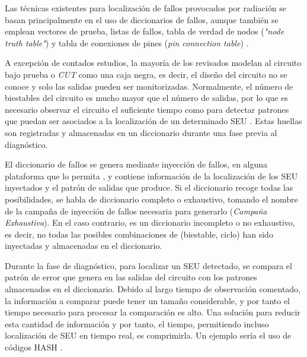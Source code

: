 Las técnicas existentes para localización de fallos provocados por radiación se
basan principalmente en el uso de diccionarios de fallos, aunque también se
emplean vectores de prueba, listas de fallos, tabla de verdad de nodos
(\textit{"node truth table"}) y tabla de conexiones de pines (\textit{pin
connection table}) \cite{DiagnosisTechniques, LASAR, RTFDandD}. 

A excepción de contados estudios, la mayoría de los revisados modelan al 
circuito bajo prueba o \textit{\gls{CUT}} como una caja negra, es decir, el diseño
del circuito no se conoce y solo las salidas pueden ser monitorizadas.
Normalmente, el número de biestables del circuito es mucho mayor que el número de
salidas, por lo que es necesario observar el circuito el suficiente tiempo como
para detectar patrones que puedan ser asociados a la localización de un
determinado \gls{SEU} \cite{SEUDiagnosis}. Estas huellas son registradas y
almacenadas en un diccionario durante una fase previa al diagnóstico.

El diccionario de fallos se genera mediante inyección de fallos, en alguna
plataforma que lo permita \cite{FastFI, LeonFI, FTU}, y contiene información de 
la localización de los \gls{SEU} inyectados y el patrón de salidas que produce. 
Si el diccionario recoge todas las posibilidades, se habla de diccionario 
completo o exhaustivo, tomando el nombre de la campaña de inyección de fallos 
necesaria para generarlo (\textit{Campaña Exhaustiva}). En el caso contrario, es 
un diccionario incompleto o no exhaustivo, es decir, no todas las posibles 
combinaciones de (biestable, ciclo) han sido inyectadas y almacenadas en el 
diccionario. 

Durante la fase de diagnóstico, para localizar un \gls{SEU} detectado, se compara
el patrón de error que genera en las salidas del circuito con los patrones
almacenados en el diccionario. Debido al largo tiempo de observación comentado, la
información a comparar puede tener un tamaño considerable, y por tanto el tiempo
necesario para procesar la comparación es alto. Una solución para reducir esta
cantidad de información y por tanto, el tiempo, permitiendo incluso localización
de \gls{SEU} en tiempo real, es comprimirla. Un ejemplo sería el uso de códigos 
HASH \cite{SEUDiagnosis}.


